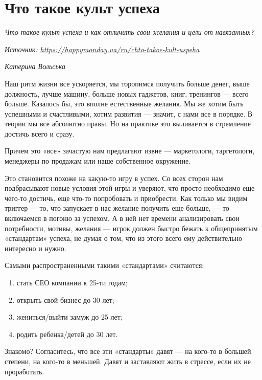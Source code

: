 \newpage
\section{Что такое культ успеха}

\textit{Что такое культ успеха и как отличить свои желания и цели от навязанных?}

\textit{Источник: \url{https://happymonday.ua/ru/chto-takoe-kult-uspeha}}

\textit{Катерина Вольська}

Наш ритм жизни все ускоряется, мы торопимся получить больше денег, выше должность, лучше машину, больше новых гаджетов, книг, тренингов — всего больше. Казалось бы, это вполне естественные желания. Мы же хотим быть успешными и счастливыми, хотим развития — значит, с нами все в порядке. В теории мы все абсолютно правы. Но на практике это выливается в стремление достичь всего и сразу.

\begin{fancyquotes}
    Причем это «все» зачастую нам предлагают извне  — маркетологи, таргетологи, менеджеры по продажам или наше собственное окружение.
\end{fancyquotes}

Это становится похоже на какую-то игру в успех. Со всех сторон нам подбрасывают новые условия этой игры и уверяют, что просто необходимо еще чего-то достичь, еще что-то попробовать и приобрести. Как только мы видим триггер — то, что запускает в нас желание получить еще больше, — то включаемся в погоню за успехом. А в ней нет времени анализировать свои потребности, мотивы, желания — игрок должен быстро бежать к общепринятым «стандартам» успеха, не думая о том, что из этого всего ему действительно интересно и нужно.

Самыми распространенными такими «стандартами» считаются:

\begin{enumerate}
    \item стать СЕО компании к 25-ти годам;
    \item открыть свой бизнес до 30 лет;
    \item жениться/выйти замуж до 25 лет;
    \item родить ребенка/детей до 30 лет.
\end{enumerate}

Знакомо? Согласитесь, что все эти «стандарты» давят — на кого-то в большей степени, на кого-то в меньшей. Давят и заставляют жить в стрессе, если их не проработать.


